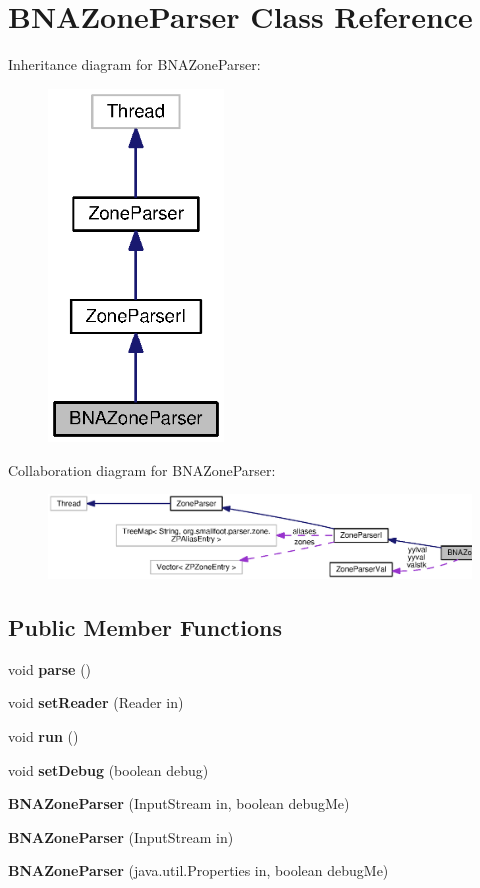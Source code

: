 \section{B\+N\+A\+Zone\+Parser Class Reference}
\label{classorg_1_1smallfoot_1_1parser_1_1zone_1_1BNAZoneParser}


Inheritance diagram for B\+N\+A\+Zone\+Parser\+:\nopagebreak
\begin{figure}[H]
\begin{center}
\leavevmode
\includegraphics[width=132pt]{classorg_1_1smallfoot_1_1parser_1_1zone_1_1BNAZoneParser__inherit__graph}
\end{center}
\end{figure}


Collaboration diagram for B\+N\+A\+Zone\+Parser\+:\nopagebreak
\begin{figure}[H]
\begin{center}
\leavevmode
\includegraphics[width=350pt]{classorg_1_1smallfoot_1_1parser_1_1zone_1_1BNAZoneParser__coll__graph}
\end{center}
\end{figure}
\subsection*{Public Member Functions}
\begin{DoxyCompactItemize}
\item 
void {\bf parse} ()
\item 
void {\bf set\+Reader} (Reader in)
\item 
void {\bf run} ()
\item 
void {\bf set\+Debug} (boolean debug)
\item 
{\bf B\+N\+A\+Zone\+Parser} (Input\+Stream in, boolean debug\+Me)
\item 
{\bf B\+N\+A\+Zone\+Parser} (Input\+Stream in)
\item 
{\bf B\+N\+A\+Zone\+Parser} (java.\+util.\+Properties in, boolean debug\+Me)
\end{DoxyCompactItemize}
